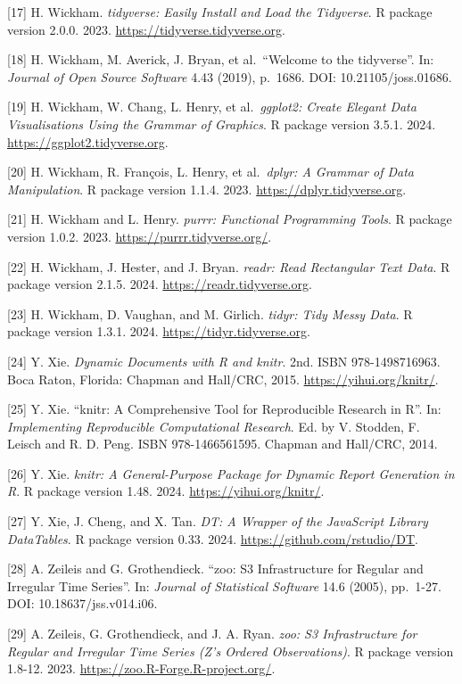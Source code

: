 \documentclass[
  letterpaper,
  DIV=11,
  numbers=noendperiod]{scrreprt}
\begin{document}
{[}17{]} H. Wickham. \emph{tidyverse: Easily Install and Load the
Tidyverse}. R package version 2.0.0. 2023.
\url{https://tidyverse.tidyverse.org}.

{[}18{]} H. Wickham, M. Averick, J. Bryan, et al.~``Welcome to the
tidyverse''. In: \emph{Journal of Open Source Software} 4.43 (2019),
p.~1686. DOI: 10.21105/joss.01686.

{[}19{]} H. Wickham, W. Chang, L. Henry, et al.~\emph{ggplot2: Create
Elegant Data Visualisations Using the Grammar of Graphics}. R package
version 3.5.1. 2024. \url{https://ggplot2.tidyverse.org}.

{[}20{]} H. Wickham, R. François, L. Henry, et al.~\emph{dplyr: A
Grammar of Data Manipulation}. R package version 1.1.4. 2023.
\url{https://dplyr.tidyverse.org}.

{[}21{]} H. Wickham and L. Henry. \emph{purrr: Functional Programming
Tools}. R package version 1.0.2. 2023.
\url{https://purrr.tidyverse.org/}.

{[}22{]} H. Wickham, J. Hester, and J. Bryan. \emph{readr: Read
Rectangular Text Data}. R package version 2.1.5. 2024.
\url{https://readr.tidyverse.org}.

{[}23{]} H. Wickham, D. Vaughan, and M. Girlich. \emph{tidyr: Tidy Messy
Data}. R package version 1.3.1. 2024. \url{https://tidyr.tidyverse.org}.

{[}24{]} Y. Xie. \emph{Dynamic Documents with R and knitr}. 2nd. ISBN
978-1498716963. Boca Raton, Florida: Chapman and Hall/CRC, 2015.
\url{https://yihui.org/knitr/}.

{[}25{]} Y. Xie. ``knitr: A Comprehensive Tool for Reproducible Research
in R''. In: \emph{Implementing Reproducible Computational Research}. Ed.
by V. Stodden, F. Leisch and R. D. Peng. ISBN 978-1466561595. Chapman
and Hall/CRC, 2014.

{[}26{]} Y. Xie. \emph{knitr: A General-Purpose Package for Dynamic
Report Generation in R}. R package version 1.48. 2024.
\url{https://yihui.org/knitr/}.

{[}27{]} Y. Xie, J. Cheng, and X. Tan. \emph{DT: A Wrapper of the
JavaScript Library DataTables}. R package version 0.33. 2024.
\url{https://github.com/rstudio/DT}.

{[}28{]} A. Zeileis and G. Grothendieck. ``zoo: S3 Infrastructure for
Regular and Irregular Time Series''. In: \emph{Journal of Statistical
Software} 14.6 (2005), pp.~1-27. DOI: 10.18637/jss.v014.i06.

{[}29{]} A. Zeileis, G. Grothendieck, and J. A. Ryan. \emph{zoo: S3
Infrastructure for Regular and Irregular Time Series (Z's Ordered
Observations)}. R package version 1.8-12. 2023.
\url{https://zoo.R-Forge.R-project.org/}.
\end{document}

